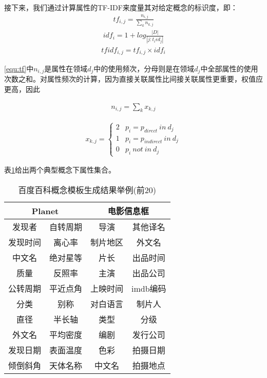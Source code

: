 接下来，我们通过计算属性的TF-IDF来度量其对给定概念的标识度，即：
\begin{align}
\label{equ:tf}
tf_{i,j}=\frac{n_{i,j}}{\sum_{k}{n_{k,j}}}
\end{align}
\begin{align}
\label{equ:idf}
idf_{i}=1+log\frac{\left | D \right |}{\left | j:t_i  \epsilon d_j \right |}
\end{align}
\begin{align}
\label{equ:tfidf}
tfidf_{i,j}=tf_{i,j}\times idf_{i}
\end{align}

\ref{equ:tf}中$n_{i,j}$是属性在领域$d_{j}$中的使用频次，分母则是在领域$d_{j}$中全部属性的使用次数之和。对属性频次的计算，因为直接关联属性比间接关联属性更重要，权值应更高，因此

\begin{align}
n_{i,j} = {\sum_{k}{x_{k,j}}}
\end{align}

\begin{align}
x_{k,j} =
\left\{\begin{matrix}
2 & p_i = p_{direct} \ in \ d_j\\
1 & p_i = p_{indirect} \ in \ d_j\\
0 & p_i \ not \ in \ d_j
\end{matrix}\right.
\end{align}

表\ref{tab:baidu-template-examples}给出两个典型概念下属性集合。

\begin{table}[htb]
  \centering
  \caption{百度百科概念模板生成结果举例(前20)}
  \label{tab:baidu-template-examples}
    \begin{tabular}{cccc}
      \toprule[1.5pt]
         \multicolumn{2}{c}{Planet} & \multicolumn{2}{c}{电影信息框}\\ \midrule[1pt]
         发现者   &  自转周期  & 导演     & 其他译名 \\
         发现时间 &  离心率    & 制片地区 & 外文名   \\
         中文名   &  绝对星等  & 片长     & 出品时间 \\
         质量     &  反照率    & 主演     & 出品公司 \\
         公转周期 &  平近点角  & 上映时间 & imdb编码 \\
         分类     &  别称      & 对白语言 & 制片人   \\
         直径     &  半长轴    & 类型     & 分级     \\
         外文名   &  平均密度  & 编剧     & 发行公司 \\
         发现日期 &  表面温度  & 色彩     & 拍摄日期 \\
         倾倒斜角 &  天体名称  & 中文名   & 拍摄地点 \\
      \bottomrule[1.5pt]
    \end{tabular}
\end{table}


